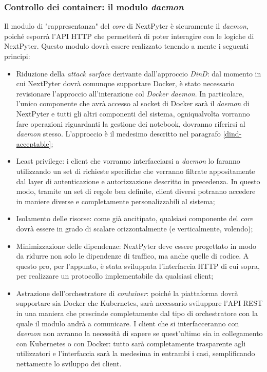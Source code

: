 \subsubsection{Controllo dei container: il modulo \textit{daemon}}
Il modulo di "rappresentanza" del \textit{core} di NextPyter è sicuramente il \textit{daemon}, poiché esporrà l'API HTTP che permetterà di poter interagire con le logiche di NextPyter.
\newline
Questo modulo dovrà essere realizzato tenendo a mente i seguenti principi:
\begin{itemize}
    \item Riduzione della \textit{attack surface} derivante dall'approccio \textit{DinD}: dal momento in cui NextPyter dovrà comunque supportare Docker, è stato necessario revisionare l'approccio all'interazione col \textit{Docker daemon}. In particolare, l'unico componente che avrà accesso al socket di Docker sarà il \textit{daemon} di NextPyter e tutti gli altri componenti del sistema, ogniqualvolta vorranno fare operazioni riguardanti la gestione dei notebook, dovranno riferirsi al \textit{daemon} stesso. L'approccio è il medesimo descritto nel paragrafo \ref{dind-acceptable};
    \item Least privilege: i client che vorranno interfacciarsi a \textit{daemon} lo faranno utilizzando un set di richieste specifiche che verranno filtrate appositamente dal layer di autenticazione e autorizzazione descritto in precedenza. In questo modo, tramite un set di regole ben definite, client diversi potranno accedere in maniere diverse e completamente personalizzabili al sistema;
    \item Isolamento delle risorse: come già ancitipato, qualsiasi componente del \textit{core} dovrà essere in grado di scalare orizzontalmente (e verticalmente, volendo);
    \item Minimizzazione delle dipendenze: NextPyter deve essere progettato in modo da ridurre non solo le dipendenze di traffico, ma anche quelle di codice. A questo pro, per l'appunto, è stata sviluppata l'interfaccia HTTP di cui sopra, per realizzare un protocollo implementabile da qualsiasi client;
    \item Astrazione dell'orchestratore di \textit{container}: poiché la piattaforma dovrà supportare sia Docker che Kubernetes, sarà necessario sviluppare l'API REST in una maniera che prescinde completamente dal tipo di orchestratore con la quale il modulo andrà a comunicare. I client che si interfacceranno con \textit{daemon} non avranno la necessità di sapere se quest'ultimo sia in collegamento con Kubernetes o con Docker: tutto sarà completamente trasparente agli utilizzatori e l'interfaccia sarà la medesima in entrambi i casi, semplificando nettamente lo sviluppo dei client.
\end{itemize}
